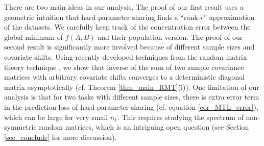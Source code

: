 



There are two main ideas in our analysis. The proof of our first result uses a geometric intuition that hard parameter sharing finds a ``rank-$r$'' approximation of the datasets.
We carefully keep track of the concentration error between the global minimum of $f(A, B)$ and their population version.
The proof of our second result is significantly more involved because of different sample sizes and covariate shifts. Using recently developed techniques from the random matrix theory technique \cite{Anisotropic}, we show that inverse of the sum of two sample covariance matrices with arbitrary covariate shifts converges to a deterministic diagonal matrix asymptotically (cf. Theorem \ref{thm_main_RMT}(i)). %
One limitation of our analysis is that for two tasks with different sample sizes, there is extra error term in the prediction loss of hard parameter sharing (cf. equation \eqref{cor_MTL_error}), which can be large for very small $n_1$. This requires studying the spectrum of non-symmetric random matrices, which is an intriguing open question (see Section \ref{sec_conclude} for more discussion).

